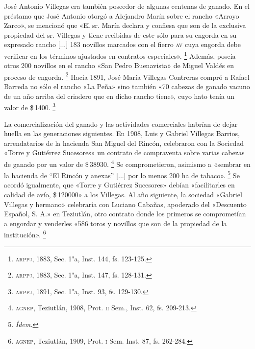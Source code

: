 \documentclass[14pt,twoside,final]{extbook} %
\let\oldfootnote\footnote
\renewcommand\footnote[1]{%
\oldfootnote{\hspace{1mm}#1}}
\begin{document}
José Antonio Villegas era también poseedor de algunas centenas de ganado. En el préstamo que José Antonio otorgó a Alejandro Marín sobre el rancho «Arroyo Zarco», se mencionó que «El sr. Marín declara y confiesa que son de la exclusiva propiedad del sr. Villegas y tiene recibidas de este sólo para su engorda en su expresado rancho [...] 183 novillos marcados con el fierro \textsc{av} cuya engorda debe verificar en los términos ajustados en contratos especiales».\footnote{\textsc{arppj}, 1883, Sec. 1"a, Inst. 144, fs. 123-125.} Además, poseía otros 200 novillos en el rancho «San Pedro Buenavista» de Miguel Valdés en proceso de engorda.\footnote{\textsc{arppj}, 1883, Sec. 1"a, Inst. 147, fs. 128-131.} Hacia 1891, José María Villegas Contreras compró a Rafael Barreda no sólo el rancho «La Peña» sino también «70 cabezas de ganado vacuno de un año arriba del criadero que en dicho rancho tiene», cuyo hato tenía un valor de \$\,1400.\footnote{\textsc{arppj}, 1891, Sec. 1"a, Inst. 93, fs. 129-130.}

La comercialización del ganado y las actividades comerciales habrían de dejar huella en las generaciones siguientes. En 1908, Luis y Gabriel Villegas Barrios, arrendatarios de la hacienda San Miguel del Rincón, celebraron con la Sociedad «Torre y Gutiérrez Sucesores» un contrato de compraventa sobre varias cabezas de ganado por un valor de \$\,38930.\footnote{\textsc{agnep}, Teziutlán, 1908, Prot. \textsc{ii} Sem., Inst. 62, fs. 209-213.} Se comprometieron, asimismo a «sembrar en la hacienda de ``El Rincón y anexas'' [...] por lo menos 200 ha de tabaco».\footnote{\em Ídem.} Se acordó igualmente, que «Torre y Gutiérrez Sucesores» debían «facilitarles en calidad de avío, \$\,120000» a los Villegas. Al año siguiente, la sociedad «Gabriel Villegas y hermano» celebraría con Luciano Cabañas, apoderado del «Descuento Español, S. A.» en Teziutlán, otro contrato donde los primeros se comprometían a engordar y venderles «586 toros y novillos que son de la propiedad de la institución».\footnote{\textsc{agnep}, Teziutlán, 1909, Prot. \textsc{i} Sem. Inst. 87, fs. 262-284.}
\end{document}
